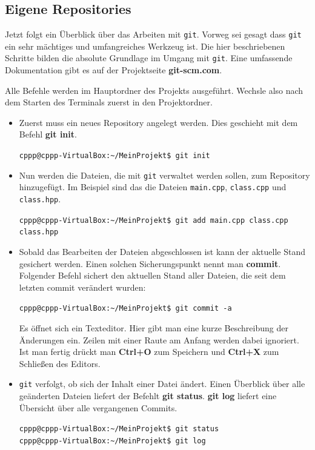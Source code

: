 \subsection{Eigene Repositories}
Jetzt folgt ein Überblick über das Arbeiten mit \texttt{git}.
Vorweg sei gesagt dass \texttt{git} ein sehr mächtiges und umfangreiches Werkzeug ist. Die hier beschriebenen Schritte bilden die absolute Grundlage im Umgang mit \texttt{git}. Eine umfassende Dokumentation gibt es auf der Projektseite \textbf{git-scm.com}.

Alle Befehle werden im Hauptordner des Projekts ausgeführt. Wechsle also nach dem Starten des Terminals zuerst in den Projektordner.

\begin{itemize}
\item Zuerst muss ein neues Repository angelegt werden. Dies geschieht mit dem Befehl \textbf{git init}.

\texttt{cppp@cppp-VirtualBox:\textasciitilde/MeinProjekt\$ git init}

\item Nun werden die Dateien, die mit \texttt{git} verwaltet werden sollen, zum Repository hinzugefügt. Im Beispiel sind das die Dateien \texttt{main.cpp}, \texttt{class.cpp} und \texttt{class.hpp}.

\texttt{cppp@cppp-VirtualBox:\textasciitilde/MeinProjekt\$ git add main.cpp class.cpp class.hpp}

\item Sobald das Bearbeiten der Dateien abgeschlossen ist kann der aktuelle Stand gesichert werden. Einen solchen Sicherungspunkt nennt man \textbf{commit}. Folgender Befehl sichert den aktuellen Stand aller Dateien, die seit dem letzten commit verändert wurden:

\texttt{cppp@cppp-VirtualBox:\textasciitilde/MeinProjekt\$ git commit -a}

Es öffnet sich ein Texteditor. Hier gibt man eine kurze Beschreibung der Änderungen ein. Zeilen mit einer Raute am Anfang werden dabei ignoriert. Ist man fertig drückt man \textbf{Ctrl+O} zum Speichern und \textbf{Ctrl+X} zum Schließen des Editors.

\item \texttt{git} verfolgt, ob sich der Inhalt einer Datei ändert. Einen Überblick über alle geänderten Dateien liefert der Befehlt \textbf{git status}. \textbf{git log} liefert eine Übersicht über alle vergangenen Commits.

\texttt{cppp@cppp-VirtualBox:\textasciitilde/MeinProjekt\$ git status}\\
\texttt{cppp@cppp-VirtualBox:\textasciitilde/MeinProjekt\$ git log}

\end{itemize}

